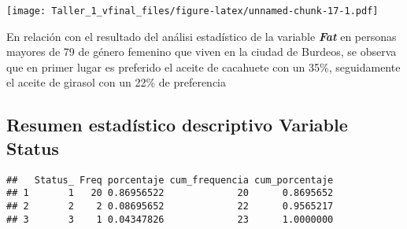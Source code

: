 \documentclass[
]{article}
\newenvironment{Shaded}{\begin{snugshade}}{\end{snugshade}}
\newcommand{\DecValTok}[1]{\textcolor[rgb]{0.00,0.00,0.81}{#1}}
\newcommand{\FunctionTok}[1]{\textcolor[rgb]{0.00,0.00,0.00}{#1}}
\newcommand{\NormalTok}[1]{#1}
\newcommand{\OtherTok}[1]{\textcolor[rgb]{0.56,0.35,0.01}{#1}}
\newcommand{\SpecialCharTok}[1]{\textcolor[rgb]{0.00,0.00,0.00}{#1}}
\begin{document}
\texttt{[image: Taller\_1\_vfinal\_files/figure-latex/unnamed-chunk-17-1.pdf]}

En relación con el resultado del análisi estadístico de la variable
\textbf{\emph{Fat}} en personas mayores de 79 de género femenino que
viven en la ciudad de Burdeos, se observa que en primer lugar es
preferido el aceite de cacahuete con un 35\%, seguidamente el aceite de
girasol con un 22\% de preferencia

\hypertarget{resumen-estaduxedstico-descriptivo-variable-status}{%
\subsection{\texorpdfstring{Resumen estadístico descriptivo Variable
\textbf{Status}}{Resumen estadístico descriptivo Variable Status}}\label{resumen-estaduxedstico-descriptivo-variable-status}}

\begin{Shaded}
\end{Shaded}

\begin{verbatim}
##   Status_ Freq porcentaje cum_frequencia cum_porcentaje
## 1       1   20 0.86956522             20      0.8695652
## 2       2    2 0.08695652             22      0.9565217
## 3       3    1 0.04347826             23      1.0000000
\end{verbatim}
\end{document}
